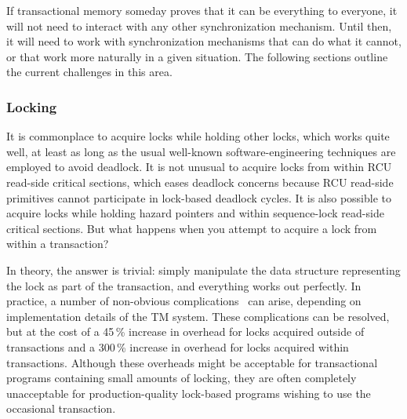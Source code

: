 If transactional memory someday proves that it can be everything to everyone,
it will not need to interact with any other synchronization mechanism.
Until then, it will need to work with synchronization mechanisms that
can do what it cannot, or that work more naturally in a given situation.
The following sections outline the current challenges in this area.

\subsubsection{Locking}
\label{sec:future:Locking}

It is commonplace to acquire locks while holding other locks, which works
quite well, at least as long as the usual well-known software-engineering
techniques are employed to avoid deadlock.
It is not unusual to acquire locks from within RCU read-side critical
sections, which eases deadlock concerns because RCU read-side primitives
cannot participate in lock-based deadlock cycles.
It is also possible to acquire locks while holding hazard pointers and
within sequence-lock read-side critical sections.
But what happens when you attempt to acquire a lock from within a transaction?

In theory, the answer is trivial: simply manipulate the data structure
representing the lock as part of the transaction, and everything works
out perfectly.
In practice, a number of non-obvious complications~\cite{Volos2008TRANSACT}
can arise, depending on implementation details of the TM system.
These complications can be resolved, but at the cost of a 45\,\% increase in
overhead for locks acquired outside of transactions and a 300\,\% increase
in overhead for locks acquired within transactions.
Although these overheads might be acceptable for transactional
programs containing small amounts of locking, they are often completely
unacceptable for production-quality lock-based programs wishing to use
the occasional transaction.

